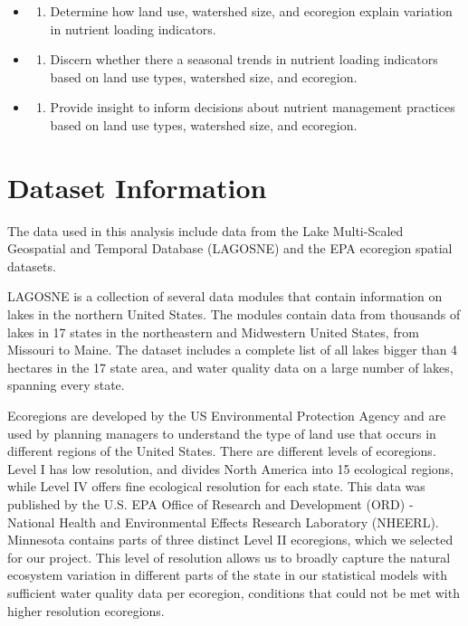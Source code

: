 \documentclass[12pt,]{article}
\providecommand{\tightlist}{%
  \setlength{\itemsep}{0pt}\setlength{\parskip}{0pt}}
\begin{document}
\begin{itemize}
\item
  \begin{enumerate}
  \def\labelenumi{\arabic{enumi}.}
  \tightlist
  \item
    Determine how land use, watershed size, and ecoregion explain
    variation in nutrient loading indicators.
  \end{enumerate}
\item
  \begin{enumerate}
  \def\labelenumi{\arabic{enumi}.}
  \setcounter{enumi}{1}
  \tightlist
  \item
    Discern whether there a seasonal trends in nutrient loading
    indicators based on land use types, watershed size, and ecoregion.
  \end{enumerate}
\item
  \begin{enumerate}
  \def\labelenumi{\arabic{enumi}.}
  \setcounter{enumi}{2}
  \tightlist
  \item
    Provide insight to inform decisions about nutrient management
    practices based on land use types, watershed size, and ecoregion.
  \end{enumerate}
\end{itemize}

\newpage

\hypertarget{dataset-information}{%
\section{Dataset Information}\label{dataset-information}}

The data used in this analysis include data from the Lake Multi-Scaled
Geospatial and Temporal Database (LAGOSNE) and the EPA ecoregion spatial
datasets.

LAGOSNE is a collection of several data modules that contain information
on lakes in the northern United States. The modules contain data from
thousands of lakes in 17 states in the northeastern and Midwestern
United States, from Missouri to Maine. The dataset includes a complete
list of all lakes bigger than 4 hectares in the 17 state area, and water
quality data on a large number of lakes, spanning every state.

Ecoregions are developed by the US Environmental Protection Agency and
are used by planning managers to understand the type of land use that
occurs in different regions of the United States. There are different
levels of ecoregions. Level I has low resolution, and divides North
America into 15 ecological regions, while Level IV offers fine
ecological resolution for each state. This data was published by the
U.S. EPA Office of Research and Development (ORD) - National Health and
Environmental Effects Research Laboratory (NHEERL). Minnesota contains
parts of three distinct Level II ecoregions, which we selected for our
project. This level of resolution allows us to broadly capture the
natural ecosystem variation in different parts of the state in our
statistical models with sufficient water quality data per ecoregion,
conditions that could not be met with higher resolution ecoregions.
\end{document}

